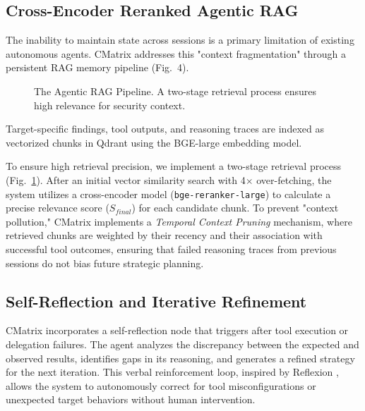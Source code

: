 \documentclass[conference,compsoc]{IEEEtran}
\begin{document}
\subsection{Cross-Encoder Reranked Agentic RAG}
The inability to maintain state across sessions is a primary limitation of existing autonomous agents. CMatrix addresses this "context fragmentation" through a persistent RAG memory pipeline (Fig.~4). 

\begin{figure}[htbp]
\centering
{}
\caption{The Agentic RAG Pipeline. A two-stage retrieval process ensures high relevance for security context.}
\label{fig:rag}
\end{figure}

Target-specific findings, tool outputs, and reasoning traces are indexed as vectorized chunks in Qdrant using the BGE-large embedding model.

To ensure high retrieval precision, we implement a two-stage retrieval process (Fig.~\ref{fig:rag}). After an initial vector similarity search with 4$\times$ over-fetching, the system utilizes a cross-encoder model (\texttt{bge-reranker-large}) to calculate a precise relevance score ($S_{final}$) for each candidate chunk. To prevent "context pollution," CMatrix implements a \textit{Temporal Context Pruning} mechanism, where retrieved chunks are weighted by their recency and their association with successful tool outcomes, ensuring that failed reasoning traces from previous sessions do not bias future strategic planning.

\subsection{Self-Reflection and Iterative Refinement}
CMatrix incorporates a self-reflection node that triggers after tool execution or delegation failures. The agent analyzes the discrepancy between the expected and observed results, identifies gaps in its reasoning, and generates a refined strategy for the next iteration. This verbal reinforcement loop, inspired by Reflexion \cite{reflexion}, allows the system to autonomously correct for tool misconfigurations or unexpected target behaviors without human intervention.
\end{document}
